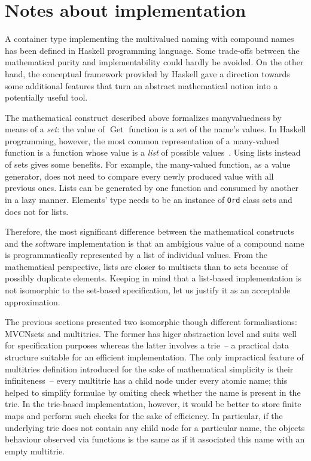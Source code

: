 \documentclass{article}
\theoremstyle{definition}
\newcommand{\deref}{\operatorname{Get}}
\begin{document}
\section{Notes about implementation}

A container type implementing the multivalued naming with compound names has
been defined in Haskell programming language. Some trade-offs between the
mathematical purity and implementability could hardly be avoided. On the other
hand, the conceptual framework provided by Haskell gave a
direction towards some additional features that turn an abstract mathematical
notion into a potentially useful tool.

The mathematical construct described above formalizes manyvaluedness by means
of a \emph{set}: the value of $\deref$ function is a set of the name's values.
In Haskell programming, however, the most common representation of a many-valued
function is a function whose value is a \emph{list} of possible
values~\cite[p.~285]{bib:lipovaca}.  Using lists instead of sets gives some
benefits. For example, the many-valued function, as a value generator, does not
need to compare every newly produced value with all previous ones. Lists can be
generated by one function and consumed by another in a lazy manner. Elements'
type needs to be an instance of \lstinline{Ord} class sets and does not for
lists.

Therefore, the most significant difference between the mathematical constructs
and the software implementation is that an ambigious value of a compound name is
programmatically represented by a list of individual values.  From the
mathematical perspective, lists are closer to multisets than to sets because of
possibly duplicate elements.  Keeping in mind that a list-based implementation
is not isomorphic to the set-based specification, let us justify it as an
acceptable approximation.

The previous sections presented two isomorphic though different formalisations:
MVCNsets and multitries. The former has higer abstraction level and suits well
for specification purposes whereas the latter involves a trie~-- a practical
data structure suitable for an efficient implementation. The only impractical
feature of multitries definition introduced for the sake of mathematical
simplicity is their infiniteness~-- every multitrie has a child node under
every atomic name; this helped to simplify formulae by omiting check whether the
name is present in the trie.  In the trie-based implementation, however, it would be
better to store finite maps and perform such checks for the sake of efficiency.
In particular, if the underlying trie does not contain any child node for a
particular name, the objects behaviour observed via functions is the same as if
it associated this name with an empty multitrie.
\end{document}

